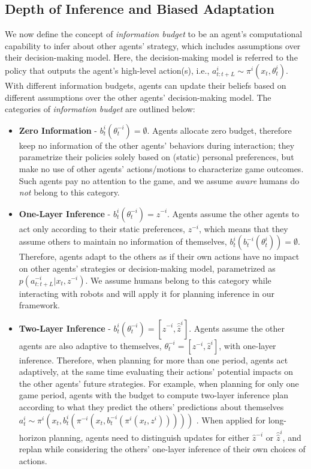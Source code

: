 \documentclass[letterpaper, 10 pt, conference]{ieeeconf}  %
\begin{document}
\subsection{Depth of Inference and Biased Adaptation}
We now define the concept of \textit{information budget} to be an agent's 
computational capability to infer about other agents' strategy, 
which includes assumptions over their decision-making model. Here, the 
decision-making model is referred to the policy that outputs 
the agent's high-level action(s), i.e., 
$a^i_{t:t+L} \sim \pi^i(x_t,\theta^i_t)$. With different information budgets, 
agents can update their beliefs based on different assumptions over the 
other agents' decision-making model. 
The categories of \textit{information budget} are outlined below:

\begin{itemize}
	\item \textbf{Zero Information} - $b^i_t(\theta^{-i}_t) = \emptyset$. Agents 
    allocate zero budget, therefore keep no information of the other agents' 
    behaviors during interaction; they 
    parametrize their policies solely based on (static) personal preferences, 
    but make 
    no use of other agents' actions/motions to characterize game outcomes. 
    Such agents pay no attention to the game, and we 
    assume \textit{aware} humans do \textit{not} belong to this category.
	\item \textbf{One-Layer Inference} - $b^i_t(\theta^{-i}_t) = \hat{z}^{-i}$. 
    Agents assume the other agents to act only according to their static 
    preferences, $z^{-i}$, which means that they assume others to maintain no 
    information of themselves, $b^i_t(b^{-i}_t(\theta^i_t))=\emptyset$.  
    Therefore, agents adapt to the others as if their own actions have no 
    impact on other agents' strategies or decision-making model, parametrized 
    as 
    $p(a^{-i}_{t:t+L}|x_t, z^{-i})$. We assume humans belong to this 
    category while interacting with robots and will apply it for planning 
    inference in our framework.
	\item \textbf{Two-Layer Inference} - $b^i_t(\theta^{-i}_t) = [\hat{z}^{-i}, \hat{\hat{z}}^i]$. Agents assume the other agents are also adaptive to themselves,
	$\theta^{-i}_t = [z^{-i}, \hat{z}^{i}]$, with one-layer inference. 
    Therefore, when planning for more than one period, agents act adaptively, 
    at the same time evaluating their actions' potential impacts on the 
    other agents' future strategies. For example, when planning for only one game period, 
    agents with the budget to compute two-layer inference plan according to 
    what they 
    predict the others' predictions about themselves 
    $a^i_t \sim \pi^i(x_t, b^i_t(\pi^{-i}(x_t,b^{-i}_t(\pi^i(x_t,{z}^i)))))$
    . When applied for long-horizon planning, agents need to distinguish 
    updates for either $\hat{z}^{-i}$ or $\hat{\hat{z}}^i$, and replan while 
    considering the others' one-layer inference of their own choices of 
    actions. 
    

\end{itemize}
\end{document}
